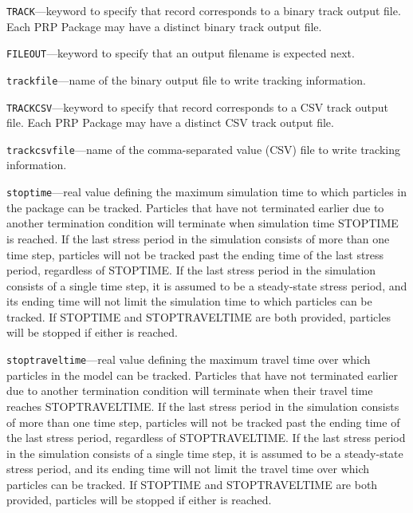 \begin{description}
\item \texttt{TRACK}---keyword to specify that record corresponds to a binary track output file.  Each PRP Package may have a distinct binary track output file.

\item \texttt{FILEOUT}---keyword to specify that an output filename is expected next.

\item \texttt{trackfile}---name of the binary output file to write tracking information.

\item \texttt{TRACKCSV}---keyword to specify that record corresponds to a CSV track output file.  Each PRP Package may have a distinct CSV track output file.

\item \texttt{trackcsvfile}---name of the comma-separated value (CSV) file to write tracking information.

\item \texttt{stoptime}---real value defining the maximum simulation time to which particles in the package can be tracked.  Particles that have not terminated earlier due to another termination condition will terminate when simulation time STOPTIME is reached.  If the last stress period in the simulation consists of more than one time step, particles will not be tracked past the ending time of the last stress period, regardless of STOPTIME.  If the last stress period in the simulation consists of a single time step, it is assumed to be a steady-state stress period, and its ending time will not limit the simulation time to which particles can be tracked.  If STOPTIME and STOPTRAVELTIME are both provided, particles will be stopped if either is reached.

\item \texttt{stoptraveltime}---real value defining the maximum travel time over which particles in the model can be tracked.  Particles that have not terminated earlier due to another termination condition will terminate when their travel time reaches STOPTRAVELTIME.  If the last stress period in the simulation consists of more than one time step, particles will not be tracked past the ending time of the last stress period, regardless of STOPTRAVELTIME.  If the last stress period in the simulation consists of a single time step, it is assumed to be a steady-state stress period, and its ending time will not limit the travel time over which particles can be tracked.  If STOPTIME and STOPTRAVELTIME are both provided, particles will be stopped if either is reached.


\end{description}
